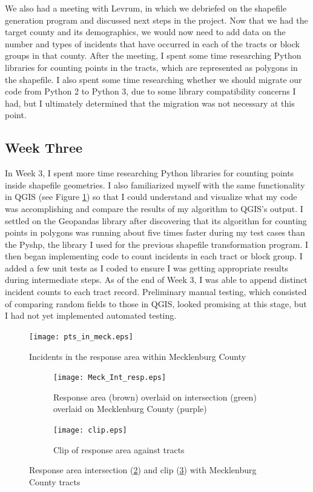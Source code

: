 \documentclass[onecolumn, draftclsnofoot,10pt, compsoc]{IEEEtran}
\begin{document}
\begin{singlespace}
We also had a meeting with Levrum, in which we debriefed on the shapefile generation program and discussed next steps in the project. Now that we had the target county and its demographics, we would now need to add data on the number and types of incidents that have occurred in each of the tracts or block groups in that county. After the meeting, I spent some time researching Python libraries for counting points in the tracts, which are represented as polygons in the shapefile. I also spent some time researching whether we should migrate our code from Python 2 to Python 3, due to some library compatibility concerns I had, but I ultimately determined that the migration was not necessary at this point.

\subsection{Week Three}
In Week 3, I spent more time researching Python libraries for counting points inside shapefile geometries. I also familiarized myself with the same functionality in QGIS (see Figure \ref{fig:pts_in_meck}) so that I could understand and visualize what my code was accomplishing and compare the results of my algorithm to QGIS's output. I settled on the Geopandas library after discovering that its algorithm for counting points in polygons was running about five times faster during my test cases than the Pyshp, the library I used for the previous shapefile transformation program. I then began implementing code to count incidents in each tract or block group. I added a few unit tests as I coded to ensure I was getting appropriate results during intermediate steps. As of the end of Week 3, I was able to append distinct incident counts to each tract record. Preliminary manual testing, which consisted of comparing random fields to those in QGIS, looked promising at this stage, but I had not yet implemented automated testing.

\begin{figure}[h!]
    \centering
    \texttt{[image: pts\_in\_meck.eps]}
    \caption{Incidents in the response area within Mecklenburg County}
    \label{fig:pts_in_meck}
\end{figure}


\begin{figure}
\centering
\begin{subfigure}{.5\textwidth}
  \centering
  \texttt{[image: Meck\_Int\_resp.eps]}
  \caption{Response area (brown) overlaid on intersection (green) overlaid on Mecklenburg County (purple)}
  \label{fig:meck_int_resp}
\end{subfigure}%
\begin{subfigure}{.5\textwidth}
  \centering
  \texttt{[image: clip.eps]}
  \caption{Clip of response area against tracts}
  \label{fig:clip}
\end{subfigure}
\caption{Response area intersection (\ref{fig:meck_int_resp}) and clip (\ref{fig:clip}) with Mecklenburg County tracts}
\label{fig:clip_int_cmp}
\end{figure}



\end{singlespace}
\end{document}
